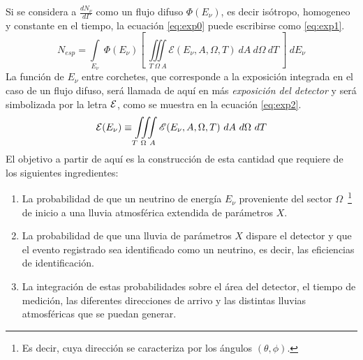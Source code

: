 	Si se considera a $\frac{dN_{\nu}}{d\Gamma}$ como un flujo difuso $\Phi(E_{\nu})$, es decir isótropo, homogeneo y constante en el tiempo, la ecuación \ref{eq:exp0} puede escribirse como \ref{eq:exp1}.
	\begin{equation}
	 N_{esp}=\int\limits_{E_{\nu}}~\Phi(E_{\nu})\left[~\iiint\limits_{T~\Omega~A}\mathscr{E}(E_{\nu},A,\Omega,T) ~dA~d\Omega~dT~\right]~dE_\nu
	 \label{eq:exp1}
	\end{equation}
	La función de $E_\nu$ entre corchetes, que corresponde a la exposición integrada en el caso de un flujo difuso, será llamada de aquí en más \emph{exposición del detector} y será simbolizada por la letra $\cal E$, como se muestra en la ecuación \ref{eq:exp2}.
	\begin{equation}
	 {\cal E}(E_\nu)\equiv\iiint\limits_{T~\Omega~A}\mathscr{E}(E_{\nu},A,\Omega,T) ~dA~d\Omega~dT
	 \label{eq:exp2}
	\end{equation}
	El objetivo a partir de aquí es la construcción de esta cantidad que requiere de los siguientes ingredientes:
	\begin{enumerate}
	 \item La probabilidad de que un neutrino de energía $E_\nu$ proveniente del sector $\Omega$~\footnote{Es decir, cuya dirección se caracteriza por los ángulos $(\theta,\phi)$.} de inicio a una lluvia atmosférica extendida de parámetros $X$.
	 \item La probabilidad de que una lluvia de parámetros $X$ dispare el detector y que el evento registrado sea identificado como un neutrino, es decir, las eficiencias de identificación.
	 \item La integración de estas probabilidades sobre el área del detector, el tiempo de medición, las diferentes direcciones de arrivo y las distintas lluvias atmosféricas que se puedan generar.
	\end{enumerate}
	
